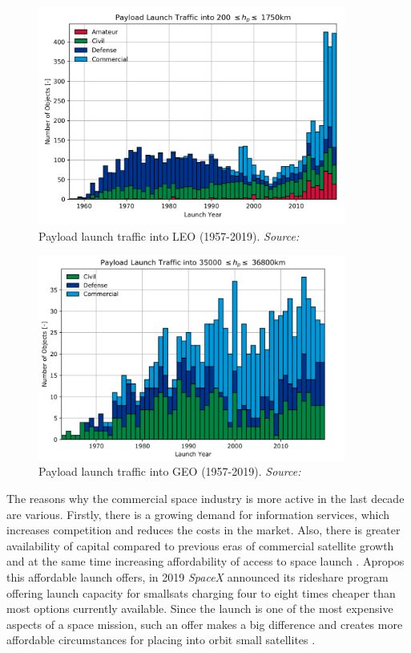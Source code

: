 \begin{figure}
\centering
\includegraphics[width=0.9\textwidth]{Images/launch_traffic_LEO.png}\caption{Payload launch traffic into LEO (1957-2019). \textit{Source: \cite{ESA 2020}}}
\label{launch_traffic_LEO} 
\end{figure}

\begin{figure}
\centering
\includegraphics[width=0.9\textwidth]{Images/launch_traffic_GEO.png}\caption{Payload launch traffic into GEO (1957-2019). \textit{Source: \cite{ESA 2020}}}
\label{launch_traffic_GEO} 
\end{figure}

The reasons why the commercial space industry is more active in the last decade are various. Firstly, there is a growing demand for information services, which increases competition and reduces the costs in the market. Also, there is greater availability of capital compared to previous eras of commercial satellite growth and at the same time increasing affordability of access to space launch \cite{Hallex}. Apropos this affordable launch offers, in 2019 \textit{SpaceX} announced its rideshare program offering launch capacity for smallsats charging four to eight times cheaper than most options currently available. Since the launch is one of the most expensive aspects of a space mission, such an offer makes a big difference and creates more affordable circumstances for placing into orbit small satellites \cite{Erwin}.

